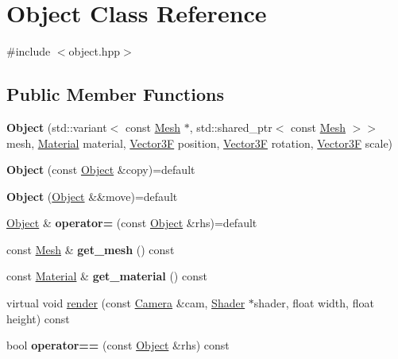 \hypertarget{class_object}{}\section{Object Class Reference}
\label{class_object}


{\ttfamily \#include $<$object.\+hpp$>$}

\subsection*{Public Member Functions}
\begin{DoxyCompactItemize}
\item 
\mbox{\label{class_object_a3852f892594a227653d27b36863b5532}} 
{\bfseries Object} (std\+::variant$<$ const \mbox{\hyperlink{class_mesh}{Mesh}} $\ast$, std\+::shared\+\_\+ptr$<$ const \mbox{\hyperlink{class_mesh}{Mesh}} $>$$>$ mesh, \mbox{\hyperlink{class_material}{Material}} material, \mbox{\hyperlink{class_vector3}{Vector3F}} position, \mbox{\hyperlink{class_vector3}{Vector3F}} rotation, \mbox{\hyperlink{class_vector3}{Vector3F}} scale)
\item 
\mbox{\label{class_object_aaf7dbf04988a46659eca5769c5839e7b}} 
{\bfseries Object} (const \mbox{\hyperlink{class_object}{Object}} \&copy)=default
\item 
\mbox{\label{class_object_abc302f6a98cea6288dfee35571485c48}} 
{\bfseries Object} (\mbox{\hyperlink{class_object}{Object}} \&\&move)=default
\item 
\mbox{\label{class_object_adc33f671dea9d1e734a2e7991477a004}} 
\mbox{\hyperlink{class_object}{Object}} \& {\bfseries operator=} (const \mbox{\hyperlink{class_object}{Object}} \&rhs)=default
\item 
\mbox{\label{class_object_a7a375f5199dd4508699322a6f18d608d}} 
const \mbox{\hyperlink{class_mesh}{Mesh}} \& {\bfseries get\+\_\+mesh} () const
\item 
\mbox{\label{class_object_a7ed0e8152bdbedc7b289bb6f5d36fa6d}} 
const \mbox{\hyperlink{class_material}{Material}} \& {\bfseries get\+\_\+material} () const
\item 
virtual void \mbox{\hyperlink{class_object_adb2402094daa6f7e392c47236d7fef61}{render}} (const \mbox{\hyperlink{class_camera}{Camera}} \&cam, \mbox{\hyperlink{class_shader}{Shader}} $\ast$shader, float width, float height) const
\item 
\mbox{\label{class_object_adf4c88351ab218071f5dfc3f111c9a9f}} 
bool {\bfseries operator==} (const \mbox{\hyperlink{class_object}{Object}} \&rhs) const
\end{DoxyCompactItemize}
